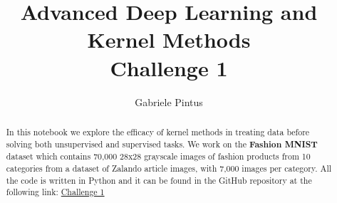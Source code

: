 \title{Advanced Deep Learning and Kernel Methods \\ Challenge 1}

%
% 
\author{Gabriele Pintus}


\begin{abstract}
    In this notebook we explore the efficacy of kernel methods in treating
    data before solving both unsupervised and supervised tasks. We work on
    the \textbf{Fashion MNIST} dataset which contains 70,000 28x28 grayscale
    images of fashion products from 10 categories from a dataset of Zalando
    article images, with 7,000 images per category. All the code is written
    in Python and it can be found in the GitHub repository at the following
    link: \href{https://github.com/GabrielePintus/AdvancedDL-KernelMethods/tree/main/Challenges/1}{Challenge 1}
\end{abstract}

\maketitle

